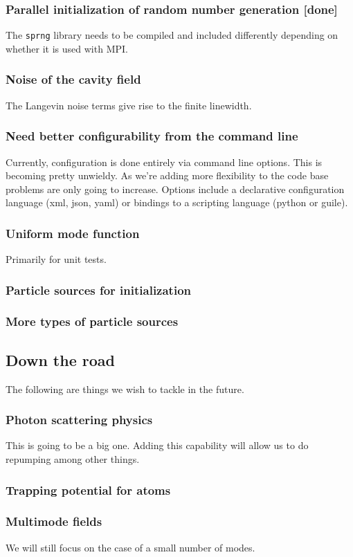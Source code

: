 \documentclass[aps, superscriptaddress, groupedaddress, preprint]{revtex4}
\begin{document}
\subsubsection{Parallel initialization of random number
generation {\bf [done]}}

The \verb~sprng~ library needs to be compiled and included
differently depending on whether it is used with MPI\@.


\subsubsection{Noise of the cavity field}

The Langevin noise terms give rise to the finite linewidth.


\subsubsection{Need better configurability from the command line}

Currently, configuration is done entirely via command line
options.  This is becoming pretty unwieldy.  As we're adding more
flexibility to  the code base problems are only going to
increase.  Options include a declarative configuration language
(xml, json, yaml) or bindings to a scripting language (python or
guile).


\subsubsection{Uniform mode function}

 Primarily for unit tests.


\subsubsection{Particle sources for initialization}


\subsubsection{More types of particle sources}


\subsection{Down the road}

The following are things we wish to tackle in the future.


\subsubsection{Photon scattering physics} This is going to be a big
one.  Adding this capability will allow us to do repumping among
other things.


\subsubsection{Trapping potential for atoms}


\subsubsection{Multimode fields} We will still focus on the case
of a small number of modes.
\end{document}
